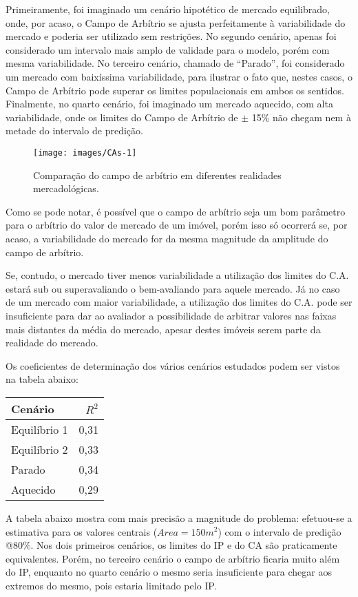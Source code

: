 \documentclass[a4paper, 12pt]{article}
\begin{document}
Primeiramente, foi imaginado um cenário hipotético de mercado
equilibrado, onde, por acaso, o Campo de Arbítrio se ajusta
perfeitamente à variabilidade do mercado e poderia ser utilizado sem
restrições. No segundo cenário, apenas foi considerado um intervalo mais
amplo de validade para o modelo, porém com mesma variabilidade. No
terceiro cenário, chamado de ``Parado'', foi considerado um mercado com
baixíssima variabilidade, para ilustrar o fato que, nestes casos, o
Campo de Arbítrio pode superar os limites populacionais em ambos os
sentidos. Finalmente, no quarto cenário, foi imaginado um mercado
aquecido, com alta variabilidade, onde os limites do Campo de Arbítrio
de \(\pm\) 15\% não chegam nem à metade do intervalo de predição.

\begin{figure}[H]

{\centering \texttt{[image: images/CAs-1]} 

}

\caption{Comparação do campo de arbítrio em diferentes realidades mercadológicas.}\label{fig:CAs}
\end{figure}

Como se pode notar, é possível que o campo de arbítrio seja um bom
parâmetro para o arbítrio do valor de mercado de um imóvel, porém isso
só ocorrerá se, por acaso, a variabilidade do mercado for da mesma
magnitude da amplitude do campo de arbítrio.

Se, contudo, o mercado tiver menos variabilidade a utilização dos
limites do C.A. estará sub ou superavaliando o bem-avaliando para aquele
mercado. Já no caso de um mercado com maior variabilidade, a utilização
dos limites do C.A. pode ser insuficiente para dar ao avaliador a
possibilidade de arbitrar valores nas faixas mais distantes da média do
mercado, apesar destes imóveis serem parte da realidade do mercado.

Os coeficientes de determinação dos vários cenários estudados podem ser
vistos na tabela abaixo:

\begin{longtable}[]{@{}lr@{}}
\toprule
Cenário & \(R^2\)\tabularnewline
\midrule
\endhead
Equilíbrio 1 & 0,31\tabularnewline
Equilíbrio 2 & 0,33\tabularnewline
Parado & 0,34\tabularnewline
Aquecido & 0,29\tabularnewline
\bottomrule
\end{longtable}

A tabela abaixo mostra com mais precisão a magnitude do problema:
efetuou-se a estimativa para os valores centrais (\(Area = 150m^2\)) com
o intervalo de predição @80\%. Nos dois primeiros cenários, os limites
do IP e do CA são praticamente equivalentes. Porém, no terceiro cenário
o campo de arbítrio ficaria muito além do IP, enquanto no quarto cenário
o mesmo seria insuficiente para chegar aos extremos do mesmo, pois
estaria limitado pelo IP.
\end{document}
